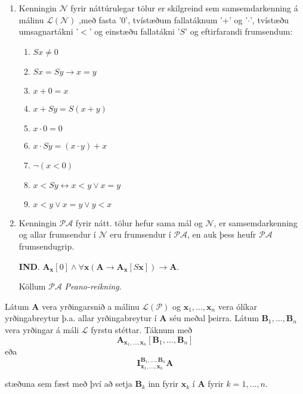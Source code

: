 \documentclass[12pt]{book}
\begin{document}
\begin{skgr}
  \begin{enumerate}[(1)]
  \item  Kenningin $\mathcal{N}$ fyrir náttúrulegar tölur er skilgreind sem
    samsemdarkenning á málinu $\mathcal{L}(\mathcal{N})$
    ,með fasta '$0$', tvístæðum fallatáknum '$+$' og '$\cdot$', tvístæðu umsagnartákni '$<$' og einstæðu fallatákni '$S$' og eftirfarandi
frumsendum:
    \begin{enumerate}
    \item $Sx \neq 0$
    \item $Sx = Sy \rightarrow x = y$
    \item $x + 0 = x$
    \item $x + Sy = S(x+y)$
    \item $x \cdot 0 = 0$
    \item $x \cdot Sy = (x \cdot y) + x$
    \item $\lnot (x < 0)$
    \item $x < Sy \leftrightarrow x < y \vee x = y$
    \item $x < y \vee x = y \vee y < x$
    \end{enumerate}
  \item Kenningin $\mathcal{P}\mathcal{A}$ fyrir nátt. tölur hefur sama mál og
    $\mathcal{N}$, er samsemdarkenning og allar frumsendur í $\mathcal{N}$ eru
    frumsendur í $\mathcal{P}\mathcal{A}$, en auk þess heufr $\mathcal{P}\mathcal{A}$
    frumsendugrip.

    \textbf{IND}. $\mathbf{A}_{\mathbf{x}}[0] \wedge \forall \mathbf{x} ( \mathbf{A} \rightarrow \mathbf{A}_{\mathbf{x}}[S\mathbf{x}]) \rightarrow \mathbf{A}$.

    Köllum $\mathcal{P}\mathcal{A}$ \emph{Peano-reikning}.
  \end{enumerate}
\end{skgr}

\begin{skgr}
  Látum $\mathbf{A}$ vera yrðingarsnið a málinu $\mathcal{L}(\mathcal{P})$
  og $\mathbf{x}_1, \dotsc, \mathbf{x}_n$ vera ólíkar yrðingabreytur
  þ.a. allar yrðingabreytur í $\mathbf{A}$ séu meðal þeirra.
  Látum $\mathbf{B}_1, \dotsc, \mathbf{B}_n$ vera yrðingar á máli
  $\mathcal{L}$ fyrstu stéttar. Táknum með
  \[ \mathbf{A}_{\mathbf{x}_1, \dotsc, \mathbf{x}_n}[\mathbf{B}_1, \dotsc, \mathbf{B}_n] \]
  eða
  \[\mathbf{I}^{\mathbf{B}_1, \dotsc, \mathbf{B}_n}_{\mathbf{x}_1, \dotsc, \mathbf{x}_n} \mathbf{A}\]

  stæðuna sem fæst með því að setja $\mathbf{B}_k$ inn fyrir $\mathbf{x}_k$ í $\mathbf{A}$ fyrir
  $k = 1, \dotsc, n$.
\end{skgr}
\end{document}
